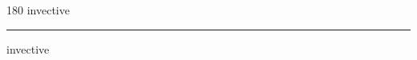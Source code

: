 
\begin{frame}
\begin{center}
\begin{turn}{180}
{\fontsize{2.5cm}{1em}\selectfont invective}
\end{turn}
\vspace{1em}\par  
\hrule
\vspace{1em}\par  
{\fontsize{2.5cm}{1em}\selectfont invective}
\end{center}
\end{frame}
